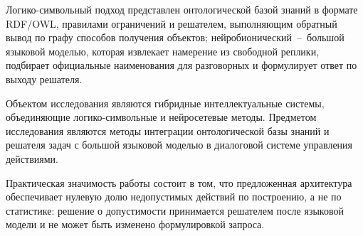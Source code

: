 Логико-символьный подход представлен онтологической базой знаний в формате RDF/OWL,
правилами ограничений и решателем, выполняющим обратный вывод по графу способов
получения объектов; нейробионический~--~большой языковой моделью, которая извлекает
намерение из свободной реплики, подбирает официальные наименования для разговорных и
формулирует ответ по выходу решателя.

Объектом исследования являются гибридные интеллектуальные системы, объединяющие
логико-символьные и нейросетевые методы. Предметом исследования являются методы
интеграции онтологической базы знаний и решателя задач с большой языковой моделью
в диалоговой системе управления действиями.

Практическая значимость работы состоит в том, что предложенная архитектура
обеспечивает нулевую долю недопустимых действий по построению, а не по статистике:
решение о допустимости принимается решателем после языковой модели и не может быть
изменено формулировкой запроса.
